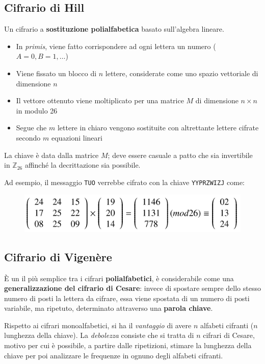 \subsection{Cifrario di Hill}
Un cifrario a \textbf{sostituzione polialfabetica} basato sull'algebra lineare.
\begin{itemize}
    \item In \textit{primis}, viene fatto corrispondere ad ogni lettera un numero ($A=0, B=1, \dots$)
    \item Viene fissato un blocco di $n$ lettere, considerate come uno spazio vettoriale di dimensione $n$
    \item Il vettore ottenuto viene moltiplicato per una matrice $M$ di dimensione $n \times n$ in modulo 26 
    \item Segue che $m$ lettere in chiaro vengono sostituite con altrettante lettere cifrate secondo $m$ equazioni lineari 
\end{itemize}
\noindent La chiave è data dalla matrice $M$; deve essere casuale a patto che sia invertibile in $\mathbb{Z}_26 $ affinché la 
decrittazione sia possibile.

\noindent Ad esempio, il messaggio \texttt{TUO} verrebbe cifrato con la chiave \texttt{YYPRZWIZJ} come:

\begin{figure}[H]
    \centering 
    \includegraphics[width=0.5\linewidth]{chapters/chap2/images/hill.png}
\end{figure}

\subsection{Cifrario di Vigenère}

È un il più semplice tra i cifrari \textbf{polialfabetici}, è considerabile come una \textbf{generalizzazione del cifrario di Cesare}: invece 
di spostare sempre dello stesso numero di posti la lettera da cifrare, essa viene spostata di un numero di posti variabile, ma ripetuto, 
determinato attraverso una \textbf{parola chiave}.

\noindent Rispetto ai cifrari monoalfabetici, si ha il \textit{vantaggio} di avere $n$ alfabeti cifranti ($n$ lunghezza della chiave). La 
\textit{debolezza} consiste che si tratta di $n$ cifrari di Cesare, motivo per cui è possibile, a partire dalle ripetizioni, stimare la 
lunghezza della chiave per poi analizzare le frequenze in ognuno degli alfabeti cifranti.

